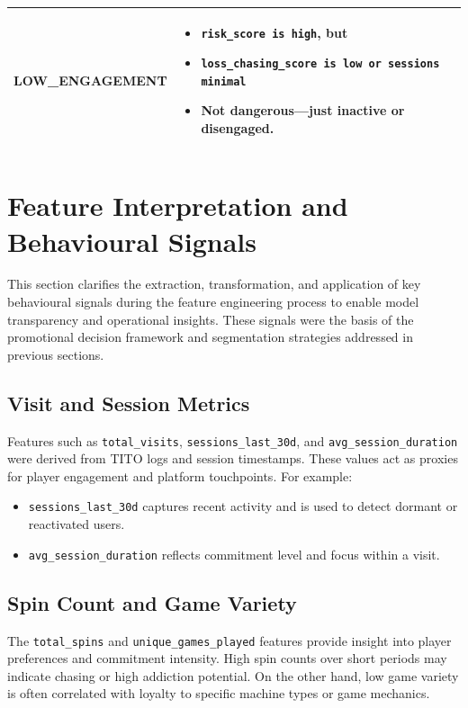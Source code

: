\documentclass[12pt,a4paper]{report}
\begin{document}
\begin{table}[H]
\begin{tabular}{p{4.3cm} p{9.5cm}}
\textbf{LOW\_ENGAGEMENT} & 
\begin{itemize}[noitemsep, topsep=0pt]
    \item \texttt{risk\_score is high}, but
    \item \texttt{loss\_chasing\_score is low or sessions minimal}
    \item Not dangerous—just inactive or disengaged.
\end{itemize}
\\
\bottomrule
\end{tabular}
\end{table}


\section{Feature Interpretation and Behavioural Signals}
\label{sec:feature_interpretation}

This section clarifies the extraction, transformation, and application of key behavioural signals during the feature engineering process to enable model transparency and operational insights. These signals were the basis of the promotional decision framework and segmentation strategies addressed in previous sections.

\subsection*{Visit and Session Metrics}
Features such as \texttt{total\_visits}, \texttt{sessions\_last\_30d}, and \texttt{avg\_session\_duration} were derived from TITO logs and session timestamps. These values act as proxies for player engagement and platform touchpoints. For example:
\begin{itemize}
    \item \texttt{sessions\_last\_30d} captures recent activity and is used to detect dormant or reactivated users.
    \item \texttt{avg\_session\_duration} reflects commitment level and focus within a visit.
\end{itemize}

\subsection*{Spin Count and Game Variety}
The \texttt{total\_spins} and \texttt{unique\_games\_played} features provide insight into player preferences and commitment intensity. High spin counts over short periods may indicate chasing or high addiction potential. On the other hand, low game variety is often correlated with loyalty to specific machine types or game mechanics.
\end{document}
